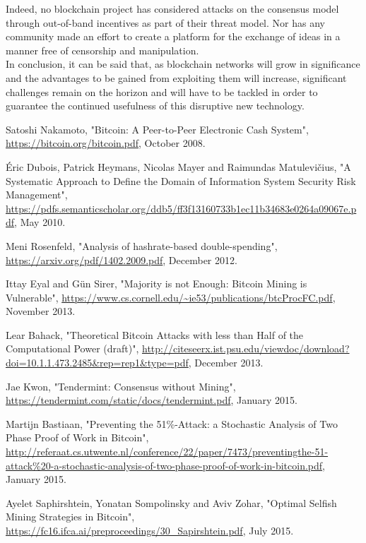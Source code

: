 \documentclass[11pt,a4paper]{article}
\begin{document}
\begin{itemize}
\begin{itemize}
Indeed, no blockchain project has considered attacks on the consensus model through out-of-band incentives as part of their threat model. Nor has any community made an effort to create a platform for the exchange of ideas in a manner free of censorship and manipulation.\\

In conclusion, it can be said that, as blockchain networks will grow in significance and the advantages to be gained from exploiting them will increase, significant challenges remain on the horizon and will have to be tackled in order to guarantee the continued usefulness of this disruptive new technology.\\

\newpage
\begin{thebibliography}{9}

Satoshi Nakamoto,
"Bitcoin: A Peer-to-Peer Electronic Cash System",
\url{https://bitcoin.org/bitcoin.pdf},
October 2008.

Éric Dubois, Patrick Heymans, Nicolas Mayer and Raimundas Matulevičius,
"A Systematic Approach to Define the Domain of Information System Security Risk Management",
\url{https://pdfs.semanticscholar.org/ddb5/ff3f13160733b1ec11b34683e0264a09067e.pdf},
May 2010.

Meni Rosenfeld,
"Analysis of hashrate-based double-spending",
\url{https://arxiv.org/pdf/1402.2009.pdf},
December 2012.

Ittay Eyal and Gün Sirer,
"Majority is not Enough: Bitcoin Mining is Vulnerable",
\url{https://www.cs.cornell.edu/~ie53/publications/btcProcFC.pdf},
November 2013.

Lear Bahack,
"Theoretical Bitcoin Attacks with less than Half of the Computational Power (draft)",
\url{http://citeseerx.ist.psu.edu/viewdoc/download?doi=10.1.1.473.2485&rep=rep1&type=pdf},
December 2013.

Jae Kwon,
"Tendermint: Consensus without Mining",
\url{https://tendermint.com/static/docs/tendermint.pdf},
January 2015.

Martijn Bastiaan,
"Preventing the 51\%-Attack: a Stochastic Analysis of Two Phase Proof of Work in Bitcoin",
\url{http://referaat.cs.utwente.nl/conference/22/paper/7473/preventingthe-51-attack%20-a-stochastic-analysis-of-two-phase-proof-of-work-in-bitcoin.pdf},
January 2015.

Ayelet Saphirshtein, Yonatan Sompolinsky and Aviv Zohar,
"Optimal Selfish Mining Strategies in Bitcoin",
\url{https://fc16.ifca.ai/preproceedings/30_Sapirshtein.pdf},
July 2015.


\end{thebibliography}
\end{itemize}
\end{itemize}
\end{document}
